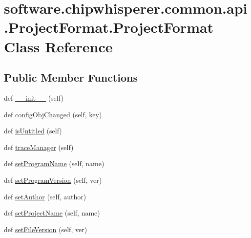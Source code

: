 \hypertarget{classsoftware_1_1chipwhisperer_1_1common_1_1api_1_1ProjectFormat_1_1ProjectFormat}{}\section{software.\+chipwhisperer.\+common.\+api.\+Project\+Format.\+Project\+Format Class Reference}
\label{classsoftware_1_1chipwhisperer_1_1common_1_1api_1_1ProjectFormat_1_1ProjectFormat}
\subsection*{Public Member Functions}
\begin{DoxyCompactItemize}
\item 
def \hyperlink{classsoftware_1_1chipwhisperer_1_1common_1_1api_1_1ProjectFormat_1_1ProjectFormat_ad8eb0f1ef261a8ca144862c5e4d84abe}{\+\_\+\+\_\+init\+\_\+\+\_\+} (self)
\item 
def \hyperlink{classsoftware_1_1chipwhisperer_1_1common_1_1api_1_1ProjectFormat_1_1ProjectFormat_a2742f1f81a01c4cb14ffab200b18e671}{config\+Obj\+Changed} (self, key)
\item 
def \hyperlink{classsoftware_1_1chipwhisperer_1_1common_1_1api_1_1ProjectFormat_1_1ProjectFormat_ab03a4c3682cb7a4fd66ad490ee869a80}{is\+Untitled} (self)
\item 
def \hyperlink{classsoftware_1_1chipwhisperer_1_1common_1_1api_1_1ProjectFormat_1_1ProjectFormat_a0c66005df46103281b60dfc272055572}{trace\+Manager} (self)
\item 
def \hyperlink{classsoftware_1_1chipwhisperer_1_1common_1_1api_1_1ProjectFormat_1_1ProjectFormat_ad75059eb962d1bf6f1bd92c525916079}{set\+Program\+Name} (self, name)
\item 
def \hyperlink{classsoftware_1_1chipwhisperer_1_1common_1_1api_1_1ProjectFormat_1_1ProjectFormat_afb8ab8cd1b8f3ee8b70e533770f0c245}{set\+Program\+Version} (self, ver)
\item 
def \hyperlink{classsoftware_1_1chipwhisperer_1_1common_1_1api_1_1ProjectFormat_1_1ProjectFormat_a6a7b659122d4d3e68f7fb21efbe3e34b}{set\+Author} (self, author)
\item 
def \hyperlink{classsoftware_1_1chipwhisperer_1_1common_1_1api_1_1ProjectFormat_1_1ProjectFormat_a0ffe7baaae03cea4b8cd4ef65df9f66b}{set\+Project\+Name} (self, name)
\item 
def \hyperlink{classsoftware_1_1chipwhisperer_1_1common_1_1api_1_1ProjectFormat_1_1ProjectFormat_acd20e5964cc8e0f38fa9271f6c1e49b1}{set\+File\+Version} (self, ver)

\end{DoxyCompactItemize}
